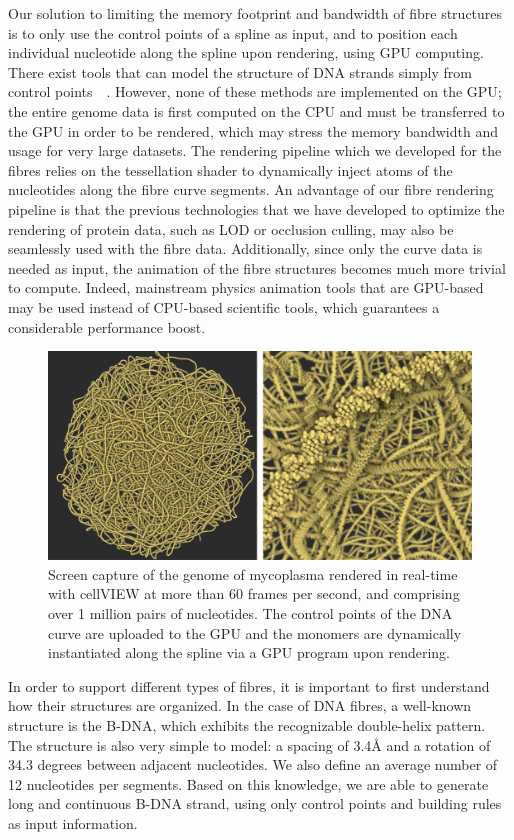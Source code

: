 Our solution to limiting the memory footprint and bandwidth of fibre structures is to only use the control points of a spline as input, and to position each individual nucleotide along the spline upon rendering, using GPU computing.
There exist tools that can model the structure of DNA strands simply from control points~\cite{lu20083dna}~\cite{hornus2013easy}.
However, none of these methods are implemented on the GPU; the entire genome data is first computed on the CPU and must be transferred to the GPU in order to be rendered, which may stress the memory bandwidth and usage for very large datasets.
The rendering pipeline which we developed for the fibres relies on the tessellation shader to dynamically inject atoms of the nucleotides along the fibre curve segments.
An advantage of our fibre rendering pipeline is that the previous technologies that we have developed to optimize the rendering of protein data, such as LOD or occlusion culling, may also be seamlessly used with the fibre data.
Additionally, since only the curve data is needed as input, the animation of the fibre structures becomes much more trivial to compute.
Indeed, mainstream physics animation tools that are GPU-based may be used instead of CPU-based scientific tools, which guarantees a considerable performance boost.
\begin{figure}
	\centering
	\includegraphics[width=0.90\linewidth]{graphics/Picture11}
	\caption{Screen capture of the genome of mycoplasma rendered in real-time with cellVIEW at more than 60 frames per second, and comprising over 1 million pairs of nucleotides.
		The control points of the DNA curve are uploaded to the GPU and the monomers are dynamically instantiated along the spline via a GPU program upon rendering. }
	\label{fig:picture11}
\end{figure}
In order to support different types of fibres, it is important to first understand how their structures are organized.
In the case of DNA fibres, a well-known structure is the B-DNA, which exhibits the recognizable double-helix pattern.
The structure is also very simple to model: a spacing of 3.4Å and a rotation of 34.3 degrees between adjacent nucleotides. 
We also define an average number of 12 nucleotides per segments.
Based on this knowledge, we are able to generate long and continuous B-DNA strand, using only control points and building rules as input information.

